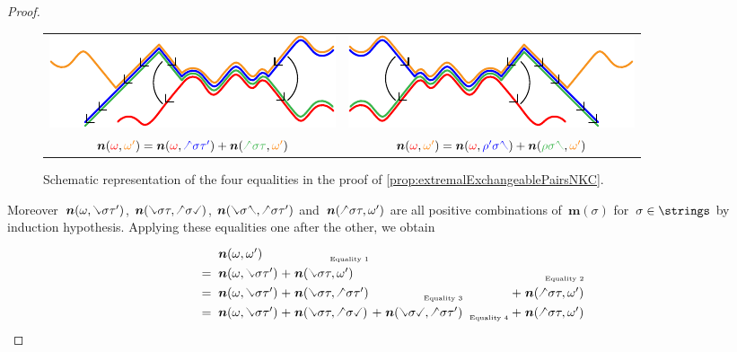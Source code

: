 \documentclass{amsart}
\theoremstyle{definition}
\renewcommand{\b}[1]{{\boldsymbol{#1}}} %
\newcommand{\red}{\color{red}} %
\newcommand{\blue}{\color{blue}} %
\newcommand{\orange}{\color{orange}} %
\newcommand{\green}{\color{green}} %
\newcommand{\hL}{\text{\rotatebox[origin=c]{180}{\checked}}}
\newcommand{\hR}{\text{\rotatebox[origin=c]{180}{\reflectbox{\checked}}}}
\newcommand{\cL}{\text{\reflectbox{\checked}}}
\newcommand{\cR}{\text{\checked}}
\begin{document}
\begin{proof}
\begin{figure}[t]
\begin{adjustbox}{center}
\begin{tabular}{c@{\qquad}c}
    		\includegraphics[scale=1.2]{fourEqualities3} & \includegraphics[scale=1.2]{fourEqualities4} \\
    		$\b{n}({\red \omega}, {\orange \omega'}) = \b{n}({\red \omega}, {\blue \hL \sigma \tau'}) + \b{n}({\green \hL \sigma \tau}, {\orange \omega'})$ & $\b{n}({\red \omega}, {\orange \omega'}) = \b{n}({\red \omega}, {\blue \rho' \sigma \hR}) + \b{n}({\green \rho \sigma \hR}, {\orange \omega'})$ \\
    	\end{tabular}
	\end{adjustbox}
	\caption{Schematic representation of the four equalities in the proof of \cref{prop:extremalExchangeablePairsNKC}.}
	\label{fig:fourEqualities}
\end{figure}
%
Moreover~$\b{n}(\omega, \cL \sigma \tau')$, $\b{n}(\cL \sigma \tau, \hL \sigma \cR)$, $\b{n}(\cL \sigma \hR, \hL \sigma \tau')$ and~$\b{n}(\hL \sigma \tau, \omega')$ are all positive combinations of~$\b{m}(\sigma)$ for~$\sigma \in \strings$ by induction hypothesis.
%
Applying these equalities one after the other, we obtain
\[
\renewcommand{\arraystretch}{1.3}
\begin{array}[t]{l@{\;\;}l@{\;}l@{\;}l@{\;}l@{\;}l@{\;}l@{\;}l@{\;}l@{\;}l}
  & \b{n}(\omega, \omega') & & \hfill\raisebox{-.1cm}{\text{\tiny{Equality 1}}} & & & & & & \\
\cline{2-4}
= & \b{n}(\omega, \cL \sigma \tau') & + & \b{n}(\cL \sigma \tau, \omega') & & & & & & \hfill\raisebox{-.1cm}{\text{\tiny{Equality 2}}} \\
\cline{4-10}
= & \b{n}(\omega, \cL \sigma \tau') & + & \b{n}(\cL \sigma \tau, \hL \sigma \tau') & & \hfill\raisebox{-.1cm}{\text{\tiny{Equality 3}}} & & & + & \b{n}(\hL \sigma \tau, \omega') \\
\cline{4-6}
= & \b{n}(\omega, \cL \sigma \tau') & + & \b{n}(\cL \sigma \tau, \hL \sigma \cR) & + & \b{n}(\cL \sigma \cR, \hL \sigma \tau') & & \hfill\raisebox{-.1cm}{\text{\tiny{Equality 4}}} & + & \b{n}(\hL \sigma \tau, \omega') \\

\end{array}\]
\end{proof}
\end{document}
